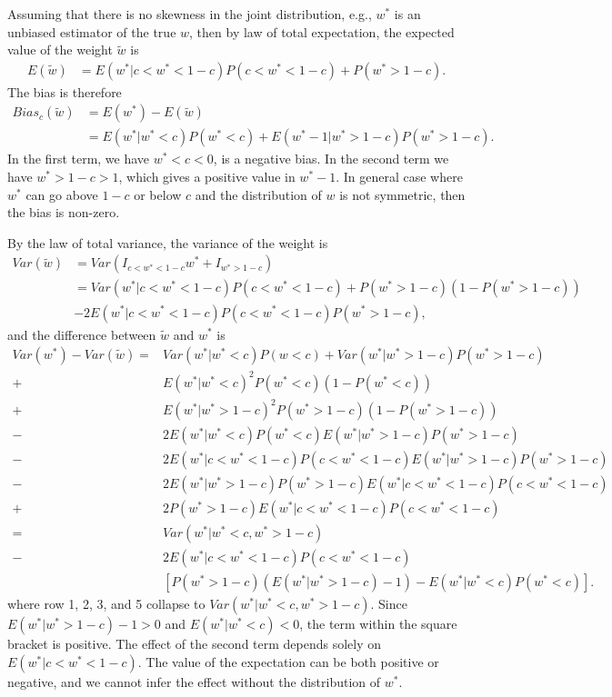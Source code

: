 \documentclass[11pt]{article}
\begin{document}
Assuming that there is no skewness in the joint distribution, e.g.,
\(w^*\) is an unbiased estimator of the true \(w\), then by law of total expectation, the expected value of
the weight \(\tilde{w}\) is
\begin{equation}
\label{eqn: E w trunc}
\begin{aligned}
E(\tilde{w}) &= E(w^*|c<w^*<1-c)P(c<w^*<1-c) + P(w^*>1-c).
\end{aligned}
\end{equation}
The bias is therefore
\begin{equation}
\label{eqn: bias w trunc}
\begin{aligned}
Bias_c(\tilde{w}) &= E(w^*) - E(\tilde{w}) \\
&= E(w^*|w^*<c)P(w^*<c) + E(w^*-1|w^*>1-c)P(w^*>1-c).
\end{aligned}
\end{equation}
In the first term, we have \(w^*<c<0\), is a negative bias. In the second term we have \(w^*>1-c>1\), which
gives a positive value in \(w^*-1\). In general case where \(w^*\) can go
above \(1-c\) or below \(c\) and the distribution of \(w\) is not symmetric, then the
bias is non-zero.

By the law of total variance, the variance of the weight is
\begin{equation}
\label{eqn: var w trunc}
\begin{aligned}
Var(\tilde{w}) &= Var(I_{c<w^*<1-c}w^*+I_{w^*>1-c})\\
&=Var(w^*|c<w^*<1-c)P(c<w^*<1-c) + P(w^*>1-c)(1-P(w^*>1-c)) \\&- 2E(w^*|c<w^*<1-c)P(c<w^*<1-c)P(w^*>1-c),
\end{aligned}
\end{equation}
and the difference between $\tilde{w}$ and $w^*$ is
\begin{equation}
\label{eqn: delta var w trunc}
\begin{aligned}
Var(w^*) - Var(\tilde{w})=& Var(w^* | w^*<c)P(w<c)+Var(w^*|w^*>1-c)P(w^*>1-c)\\
+&E(w^*|w^*<c)^2P(w^*<c)(1-P(w^*<c))\\
+&E(w^*|w^*>1-c)^2P(w^*>1-c)(1-P(w^*>1-c))\\
-&2E(w^*|w^*<c)P(w^*<c)E(w^*|w^*>1-c)P(w^*>1-c)\\
-&2E(w^*|c<w^*<1-c)P(c<w^*<1-c)E(w^*|w^*>1-c)P(w^*>1-c)\\
-&2E(w^*|w^*>1-c)P(w^*>1-c)E(w^*|c<w^*<1-c)P(c<w^*<1-c)\\
+&2P(w^*>1-c)E(w^*|c<w^*<1-c)P(c<w^*<1-c)\\
=& Var(w^*|w^*<c, w^*>1-c)\\
-&2E(w^*|c<w^*<1-c)P(c<w^*<1-c)\\&[P(w^*>1-c)(E(w^*|w^*>1-c)-1)-E(w^*|w^*<c)P(w^*<c)].
\end{aligned}
\end{equation}
where row 1, 2, 3, and 5 collapse to $Var(w^*|w^*<c, w^*>1-c)$. Since $E(w^*|w^*>1-c)-1 >0$ and $E(w^*|w^*<c)<0$, the term within the square bracket is positive. The effect of the second term depends solely on $E(w^*|c<w^*<1-c)$. The value of the expectation can be both positive or negative, and we cannot infer the effect without the distribution of $w^*$. 
\end{document}

